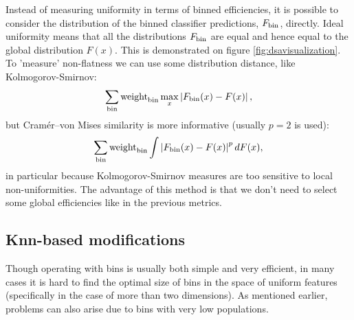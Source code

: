 Instead of measuring uniformity in terms of binned efficiencies, it is possible to consider the distribution of
the binned classifier predictions, $F_{\text{bin}}$, directly.
Ideal uniformity means that all the distributions $F_{\text{bin}}$ are equal and hence equal to the global distribution $F(x)$. 
This is demonstrated on figure \ref{fig:dsavisualization}.
To 'measure' non-flatness we can use some distribution distance, like Kolmogorov-Smirnov:
\[
	 \sum_{\text{bin}} \text{weight}_\text{bin} \max_x \left\vert F_{\text{bin}}(x) - F(x)\right\vert,
\]
but Cram\'er--von Mises similarity is more informative (usually $p=2$ is used):
\[
	 \sum_{\text{bin}} \text{weight}_\text{bin} \int \left\vert F_{\text{bin}}(x) - F(x)\right\vert^p dF(x),
\]
in particular because Kolmogorov-Smirnov measures are too sensitive to local non-uniformities.
The advantage of this method is that we don't need to select some global efficiencies like in the previous metrics.
%
%

\subsection{Knn-based modifications}

\def\knni{\text{knn}(i)}
\def\effknni{\text{eff}_{\knni}}
\def\weightknni{\text{weight}_{\knni}}
\def\Fknn{F_{\knni}}

\def\knnSDE{\text{knnSDE}}
\newcommand*\mean[1]{\overline{#1}}


Though operating with bins is usually both simple and very efficient, 
in many cases it is hard to find the optimal size of bins in the space of uniform features (specifically in the case of more than two dimensions).
As mentioned earlier, problems can also arise due to bins with very low populations.

